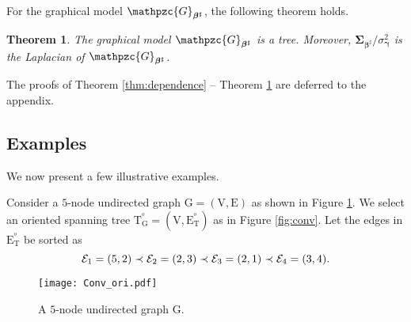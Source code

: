 \documentclass[a4paper, 11pt]{article}
\newcommand{\1}{\mathbf{1}}
\newcommand{\asf}{\mathcal{E}}
\newcommand{\xb}{\mathbf{x}}
\newcommand{\mG}{\mathrm{G}}
\newcommand{\mV}{\mathrm{V}}
\newcommand{\mE}{\mathrm{E}}
\newcommand{\mT}{\mathrm{T}}
\newcommand{\mTG}{\mT^{^o}_{\mG}}
\newcommand{\mET}{\mE_{\mT}^{^o}}
\newcommand{\mGM}{\mathpzc{G}}
\newcommand{\mEM}{\mathpzc{E}}
\newcommand{\gammab}{{\bm \gamma}}
\newcommand{\betab}{\bm{\beta}}
\newcommand{\Sigmab}{\bm{\Sigma}}
\newtheorem{theorem}{Theorem}
\newtheorem{definition}{Definition}
\begin{document}
%




For the graphical model $\mGM_{\betab^\sharp}$,   the following theorem holds.

\begin{theorem}\label{thm:Sigma}
	The graphical model $\mGM_{\betab^\sharp}$ is a tree. Moreover, $\Sigmab_{\betab^\sharp}/\sigma_{\gammab}^2$ is the Laplacian of $\mGM_{\betab^\sharp}$.
\end{theorem}

The proofs of Theorem \ref{thm:dependence} -- Theorem \ref{thm:Sigma} are deferred to the appendix. 
\subsection{Examples}
We now present a few illustrative examples.

 

 Consider a $5$-node undirected graph $\mG=(\mV,\mE)$ as shown in Figure \ref{fig:conv_ori}. We select an oriented spanning tree $\mTG=(\mV,\mET)$ as in Figure \ref{fig:conv}. Let the edges in $\mET$ be sorted as
\begin{equation}\notag
\asf_1=(5,2)\prec\asf_2=(2,3)\prec\asf_3=(2,1)\prec\asf_4=(3,4).
\end{equation}


\begin{figure}[H]
	\centering
	\texttt{[image: Conv\_ori.pdf]}
	\caption{A $5$-node undirected graph $\mG$.}
	\label{fig:conv_ori}
\end{figure}
\end{document}
